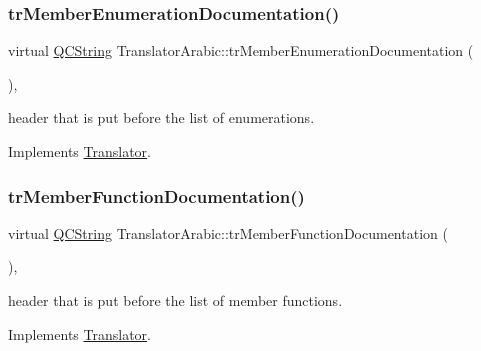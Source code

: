 \mbox{\label{class_translator_arabic_a2fa90d705fd738707ef48a5ec37fa400}} 
\subsubsection{\texorpdfstring{trMemberEnumerationDocumentation()}{trMemberEnumerationDocumentation()}}
{\footnotesize\ttfamily virtual \mbox{\hyperlink{class_q_c_string}{Q\+C\+String}} Translator\+Arabic\+::tr\+Member\+Enumeration\+Documentation (\begin{DoxyParamCaption}{ }\end{DoxyParamCaption})\hspace{0.3cm}{\ttfamily [inline]}, {\ttfamily [virtual]}}

header that is put before the list of enumerations. 

Implements \mbox{\hyperlink{class_translator}{Translator}}.

\mbox{\label{class_translator_arabic_a6f225fb8404ac090875d89f5e606eaad}} 
\subsubsection{\texorpdfstring{trMemberFunctionDocumentation()}{trMemberFunctionDocumentation()}}
{\footnotesize\ttfamily virtual \mbox{\hyperlink{class_q_c_string}{Q\+C\+String}} Translator\+Arabic\+::tr\+Member\+Function\+Documentation (\begin{DoxyParamCaption}{ }\end{DoxyParamCaption})\hspace{0.3cm}{\ttfamily [inline]}, {\ttfamily [virtual]}}

header that is put before the list of member functions. 

Implements \mbox{\hyperlink{class_translator}{Translator}}.

\mbox{\label{class_translator_arabic_ac1b9bd9609dd06ea5bc2cef16325f0ff}} 
